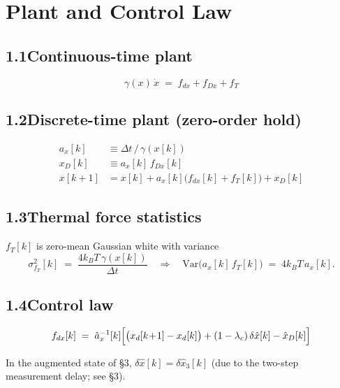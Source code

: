 \documentclass[11pt]{article}
\newcommand{\lc}{\lambda_c}
\newcommand{\kB}{k_B}
\begin{document}
\section{Plant and Control Law}

\subsection*{1.1\quad Continuous-time plant}

\begin{equation}
\gamma(x)\,\dot{x} \;=\; f_{dx} + f_{Dx} + f_T
\end{equation}

\subsection*{1.2\quad Discrete-time plant (zero-order hold)}

\begin{align}
a_x[k]     &\equiv \Delta t \,/\, \gamma(x[k]) \\[2pt]
x_D[k]     &\equiv a_x[k]\,f_{Dx}[k] \\[2pt]
x[k\!+\!1] &= x[k] + a_x[k]\bigl(f_{dx}[k] + f_T[k]\bigr) + x_D[k]
\end{align}

\subsection*{1.3\quad Thermal force statistics}

$f_T[k]$ is zero-mean Gaussian white with variance
\begin{equation}
\sigma^{2}_{f_T}[k] \;=\; \frac{4\kB T\,\gamma(x[k])}{\Delta t}
\quad\Longrightarrow\quad
\mathrm{Var}\bigl(a_x[k]\,f_T[k]\bigr) \;=\; 4\kB T\,a_x[k].
\end{equation}

\subsection*{1.4\quad Control law}

\begin{equation}
f_{dx}[k] \;=\; \hat{a}_x^{-1}[k]\Bigl[\bigl(x_d[k\!+\!1] - x_d[k]\bigr)
  + (1-\lc)\,\delta\hat{x}[k] - \hat{x}_D[k]\Bigr]
\end{equation}

\noindent In the augmented state of \S3, $\delta\hat{x}[k] = \delta\hat{x}_3[k]$ (due to the two-step measurement delay; see \S3).
\end{document}
